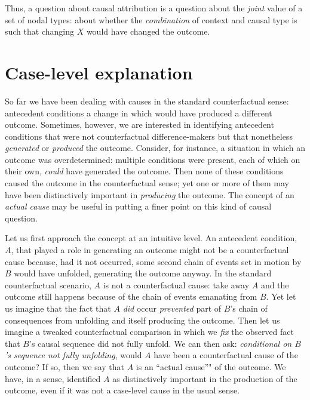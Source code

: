 \documentclass[
  12pt,
]{book}
\begin{document}
Thus, a question about causal attribution is a question about the \emph{joint} value of a set of nodal types: about whether the \emph{combination} of context and causal type is such that changing \(X\) would have changed the outcome.

\hypertarget{case-level-explanation}{%
\section{Case-level explanation}\label{case-level-explanation}}

So far we have been dealing with causes in the standard counterfactual sense: antecedent conditions a change in which would have produced a different outcome. Sometimes, however, we are interested in identifying antecedent conditions that were not counterfactual difference-makers but that nonetheless \emph{generated} or \emph{produced} the outcome. Consider, for instance, a situation in which an outcome was overdetermined: multiple conditions were present, each of which on their own, \emph{could} have generated the outcome. Then none of these conditions caused the outcome in the counterfactual sense; yet one or more of them may have been distinctively important in \emph{producing} the outcome. The concept of an \emph{actual cause} may be useful in putting a finer point on this kind of causal question.

Let us first approach the concept at an intuitive level. An antecedent condition, \(A\), that played a role in generating an outcome might not be a counterfactual cause because, had it not occurred, some second chain of events set in motion by \(B\) would have unfolded, generating the outcome anyway. In the standard counterfactual scenario, \(A\) is not a counterfactual cause: take away \(A\) and the outcome still happens because of the chain of events emanating from \(B\). Yet let us imagine that the fact that \(A\) \emph{did} occur \emph{prevented} part of \(B\)'s chain of consequences from unfolding and itself producing the outcome. Then let us imagine a tweaked counterfactual comparison in which we \emph{fix} the observed fact that \(B\)'s causal sequence did not fully unfold. We can then ask: \emph{conditional on \(B\)'s sequence not fully unfolding}, would \(A\) have been a counterfactual cause of the outcome? If so, then we say that \(A\) is an ``actual cause''" of the outcome. We have, in a sense, identified \(A\) as distinctively important in the production of the outcome, even if it was not a case-level cause in the usual sense.
\end{document}
